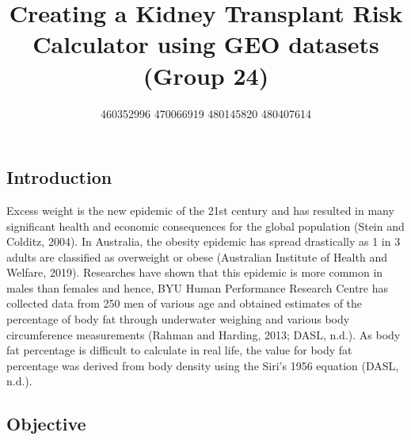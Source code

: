 \documentclass[a4paper,9pt,twocolumn,twoside,]{pinp}
\title{Creating a Kidney Transplant Risk Calculator using GEO datasets (Group
24)}
\author[]{460352996 470066919 480145820 480407614}
\affil[]{GitHub code repository is
\href{https://github.sydney.edu.au/aauw2900/DATA3888FinalProject}{here}}
\begin{document}
\verticaladjustment{-2pt}

\maketitle
\thispagestyle{firststyle}



\hypertarget{introduction}{%
\subsection{Introduction}\label{introduction}}

Excess weight is the new epidemic of the 21st century and has resulted
in many significant health and economic consequences for the global
population (Stein and Colditz, 2004). In Australia, the obesity epidemic
has spread drastically as 1 in 3 adults are classified as overweight or
obese (Australian Institute of Health and Welfare, 2019). Researches
have shown that this epidemic is more common in males than females and
hence, BYU Human Performance Research Centre has collected data from 250
men of various age and obtained estimates of the percentage of body fat
through underwater weighing and various body circumference measurements
(Rahman and Harding, 2013; DASL, n.d.). As body fat percentage is
difficult to calculate in real life, the value for body fat percentage
was derived from body density using the Siri's 1956 equation (DASL,
n.d.).

\hypertarget{objective}{%
\subsection{Objective}\label{objective}}
\end{document}

